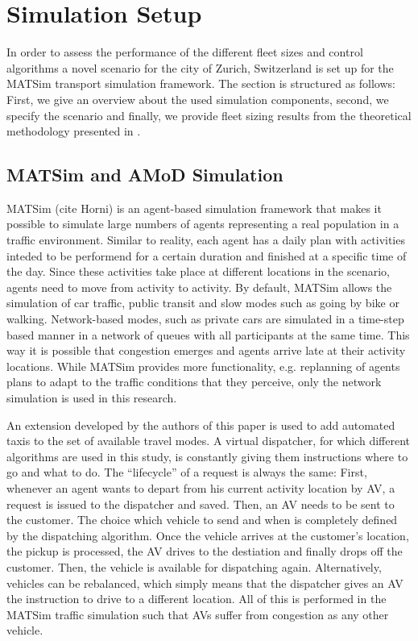 \section{Simulation Setup}

In order to assess the performance of the different fleet sizes and control
algorithms a novel scenario for the city of Zurich, Switzerland is set up
for the MATSim transport simulation framework. The section is structured as follows:
First, we give an overview about the used simulation components, second, we specify
the scenario and finally, we provide fleet sizing results from the theoretical
methodology presented in \citep{spieser2014toward}.

\subsection{MATSim and AMoD Simulation}

MATSim (cite Horni) is an agent-based simulation framework that makes it possible
to simulate large numbers of agents representing a real population in a traffic environment. Similar to reality, each agent has a daily plan with activities inteded to be performend for a certain duration and finished at a specific time of
the day. Since these activities take place at different locations in the scenario,
agents need to move from activity to activity. By default, MATSim allows the
simulation of car traffic, public transit and slow modes such as going by bike
or walking. Network-based modes, such as private cars are simulated in a time-step
based manner in a network of queues with all participants at the same time. This
way it is possible that congestion emerges and agents arrive late at their
activity locations. While MATSim provides more functionality, e.g. replanning
of agents plans to adapt to the traffic conditions that they perceive, only the
network simulation is used in this research.

An extension developed by the authors of this paper is used to add automated taxis to the set
of available travel modes. A virtual dispatcher, for which
different algorithms are used in this study, is constantly giving them instructions
where to go and what to do. The ``lifecycle'' of a request is always the same:
First, whenever an agent wants to depart from his current activity location by
AV, a request is issued to the dispatcher and saved. Then, an AV needs to be sent
to the customer. The choice which vehicle to send and when is completely defined
by the dispatching algorithm. Once the vehicle arrives at the customer's location, the pickup is processed, the AV drives to the destiation and finally drops off the customer. Then,
the vehicle is available for dispatching again. Alternatively, vehicles can be
rebalanced, which simply means that the dispatcher gives an AV the instruction
to drive to a different location. All of this is performed in the MATSim traffic
simulation such that AVs suffer from congestion as any other vehicle.

